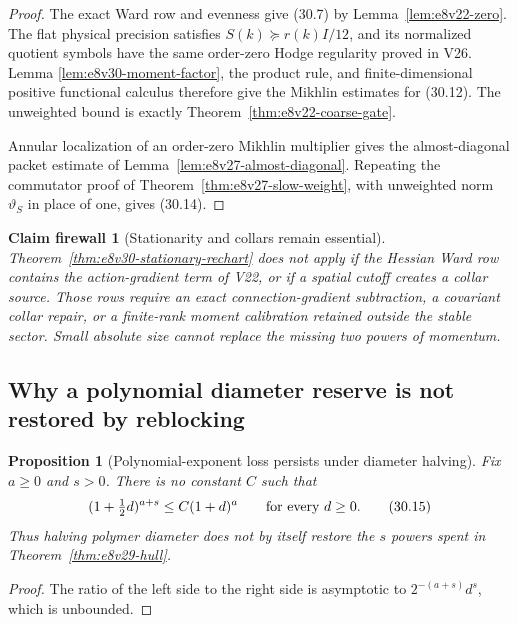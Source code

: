 \documentclass[11pt,oneside]{book}
\newtheorem{proposition}[theorem]{Proposition}
\newtheorem{firewall}[theorem]{Claim firewall}
\theoremstyle{definition}
\theoremstyle{remark}
\begin{document}
\begin{proof}
The exact Ward row and evenness give (30.7) by
Lemma~\ref{lem:e8v22-zero}.  The flat physical precision satisfies
\(S(k)\succeq r(k)I/12\), and its normalized quotient symbols have
the same order-zero Hodge regularity proved in V26.  Lemma
\ref{lem:e8v30-moment-factor}, the product rule, and finite-dimensional
positive functional calculus therefore give the Mikhlin estimates for
(30.12).  The unweighted bound is exactly
Theorem~\ref{thm:e8v22-coarse-gate}.

Annular localization of an order-zero Mikhlin multiplier gives the
almost-diagonal packet estimate of
Lemma~\ref{lem:e8v27-almost-diagonal}.  Repeating the commutator proof
of Theorem~\ref{thm:e8v27-slow-weight}, with unweighted norm
\(\vartheta_S\) in place of one, gives (30.14).
\end{proof}

\begin{firewall}[Stationarity and collars remain essential]
\label{fire:e8v30-stationarity}
Theorem~\ref{thm:e8v30-stationary-rechart} does not apply if the
Hessian Ward row contains the action-gradient term of V22, or if a
spatial cutoff creates a collar source.  Those rows require an exact
connection-gradient subtraction, a covariant collar repair, or a
finite-rank moment calibration retained outside the stable sector.
Small absolute size cannot replace the missing two powers of momentum.
\end{firewall}

\subsection{Why a polynomial diameter reserve is not restored by
reblocking}

\begin{proposition}[Polynomial-exponent loss persists under diameter
halving]
\label{prop:e8v30-polynomial-no-restore}
Fix \(a\geq0\) and \(s>0\).  There is no constant \(C\) such that
\[
 (1+\tfrac12d)^{a+s}\leq C(1+d)^a
 \qquad\hbox{for every }d\geq0.                                  \tag{30.15}
\]
Thus halving polymer diameter does not by itself restore the \(s\)
powers spent in Theorem~\ref{thm:e8v29-hull}.
\end{proposition}

\begin{proof}
The ratio of the left side to the right side is asymptotic to
\(2^{-(a+s)}d^s\), which is unbounded.
\end{proof}
\end{document}
